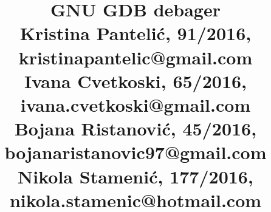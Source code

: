 \documentclass[a4paper]{report}
\newcommand{\odgovor}[1]{\textcolor{blue}{#1}}
\begin{document}
\title{GNU GDB debager\\ \small{
Kristina Pantelić, 91/2016, kristinapantelic@gmail.com 
\\
Ivana Cvetkoski, 65/2016, ivana.cvetkoski@gmail.com
\\
Bojana Ristanović, 45/2016, bojanaristanovic97@gmail.com
\\
Nikola Stamenić, 177/2016, nikola.stamenic@hotmail.com}}

\maketitle

\tableofcontents

% 
% 
% 
% 
% 
% 
\end{document}
